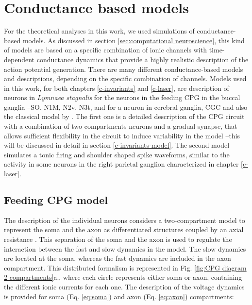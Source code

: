 \section{Conductance based models}
For the theoretical analyses in this work, we used simulations of conductance-based models. As discussed in section \ref{sec:computational neuroscience}, this kind of models are based on a specific combination of ionic channels with time-dependent conductance dynamics that provide a highly realistic description of the action potential generation. There are many different conductance-based models and descriptions, depending on the specific combination of channels. Models used in this work, for both chapters \ref{c-invariants} and \ref{c-laser}, are description of neurons in \textit{Lymnaea stagnalis} for the neurons in the feeding CPG in the buccal ganglia --SO, N1M, N2v, N3t, \parencite{vavoulis_dynamic_2007} and for a neuron in cerebral ganglia, CGC \parencite{vavoulis_balanced_2010} and also the classical model by \textcite{hodgkin_quantitative_1952}. The first one is a detailed description of the CPG circuit with a combination of two-compartments neurons and a gradual synapse, that allows sufficient flexibility in the circuit to induce variability in the model --this will be discussed in detail in section \ref{c-invariants-model}. The second model simulates a tonic firing and shoulder shaped spike waveforms, similar to the activity in some neurons in the right parietal ganglion characterized in chapter \ref{c-laser}.

\subsection{Feeding CPG model}
\label{sec:CPG model equations}
The \textcite{vavoulis_dynamic_2007} description of the individual neurons considers a two-compartment model to represent the soma and the axon as  differentiated structures coupled by an axial resistance \parencite{vavoulis_dynamic_2007}. This separation of the soma and the axon is used to regulate the interaction between the fast and slow dynamics in the model. The slow dynamics are located at the soma, whereas the fast dynamics are included in the axon compartment. This distributed formalism is represented in Fig. \ref{fig:CPG diagram 2 compartments}a., where each circle represents either soma or axon, containing the different ionic currents for each one. The description of the voltage dynamics is provided for soma (Eq. \ref{eq:soma}) and axon (Eq. \ref{eq:axon}) compartments:

